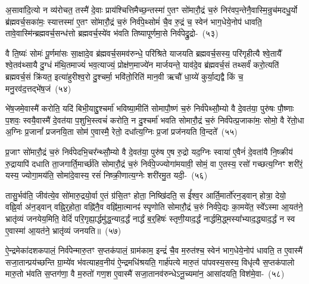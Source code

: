 अ॒सावा॑दि॒त्यो न व्य॑रोचत॒ तस्मै॑ दे॒वाः प्राय॑श्चित्ति\-मैच्छ॒न्तस्मा॑ ए॒तꣳ सो॑मारौ॒द्रं च॒रुं निर॑वप॒न्तेनै॒वास्मि॒न्रुच॑मद\-धु॒र्यो ब्र॑ह्मवर्च॒सका॑मः॒ स्यात्तस्मा॑ ए॒तꣳ सो॑मारौ॒द्रं च॒रुं निर्व॑पे॒थ्सोमं॑ चै॒व रु॒द्रं च॒ स्वेन॑ भाग॒धेये॒नोप॑ धावति॒ तावे॒वास्मि॑न्ब्रह्मवर्च॒सन्ध॑त्तो ब्रह्मवर्च॒स्ये॑व भ॑वति तिष्यापूर्णमा॒से निर्व॑पेद्रु॒द्रो-~(५३)\ip

वै ति॒ष्यः॑ सोमः॑ पू॒र्णमा॑सः सा॒क्षादे॒व ब्र॑ह्मवर्च॒समव॑\-रुन्धे॒ परि॑श्रिते याजयति ब्रह्मवर्च॒सस्य॒ परि॑गृहीत्यै श्वे॒तायै᳚ श्वे॒तव॑थ्सायै दु॒ग्धं म॑थि॒तमाज्यं॑ भव॒त्याज्यं॒ प्रोक्ष॑ण॒माज्ये॑न मार्जयन्ते॒ याव॑दे॒व ब्र॑ह्मवर्च॒सं तथ्सर्वं॑ करो॒त्यति॑ ब्रह्मवर्च॒सं क्रि॑यत॒ इत्या॑हुरीश्व॒रो दु॒श्चर्मा॒ भवि॑तो॒रिति॑ मान॒वी ऋचौ॑ धा॒य्ये॑ कुर्या॒द्यद्वै किं च॒ मनु॒रव॑द॒त्तद्भे॑ष॒जं~(५४)\ip

भे॑ष॒जमे॒वास्मै॑ करोति॒ यदि॑ बिभी॒याद्दु॒श्चर्मा॑ भविष्या॒मीति॑ सोमापौ॒ष्णं च॒रुं निर्व॑पेथ्सौ॒म्यो वै दे॒वत॑या॒ पुरु॑षः पौ॒ष्णाः प॒शवः॒ स्वयै॒वास्मै॑ दे॒वत॑या प॒शुभि॒स्त्वचं॑ करोति॒ न दु॒श्चर्मा॑ भवति सोमारौ॒द्रं च॒रुं निर्व॑पेत्प्र॒जाका॑मः॒ सोमो॒ वै रे॑तो॒धा अ॒ग्निः प्र॒जानां᳚ प्रजनयि॒ता सोम॑ ए॒वास्मै॒ रेतो॒ दधा᳚त्य॒ग्निः प्र॒जां प्रज॑नयति वि॒न्दते᳚~(५५)\ip

प्र॒जाꣳ सो॑मारौ॒द्रं च॒रुं निर्व॑पेदभि॒चर᳚न्थ्सौ॒म्यो वै दे॒वत॑या॒ पुरु॑ष ए॒ष रु॒द्रो यद॒ग्निः स्वाया॑ ए॒वैनं॑ दे॒वता॑यै नि॒ष्क्रीय॑ रु॒द्रायापि॑ दधाति ता॒जगार्ति॒मार्च्छ॑ति सोमारौ॒द्रं च॒रुं निर्व॑पे॒ज्ज्योगा॑मयावी॒ सोमं॒ वा ए॒तस्य॒ रसो॑ गच्छत्य॒ग्निꣳ शरी॑रं॒ यस्य॒ ज्योगा॒मय॑ति॒ सोमा॑दे॒वास्य॒ रसं॑ निष्क्री॒णात्य॒ग्नेः शरी॑रमु॒त यदी॒-~(५६)\ip

तासु॒र्भव॑ति॒ जीव॑त्ये॒व सो॑मारु॒द्रयो॒र्वा ए॒तं ग्र॑सि॒तꣳ होता॒ निष्खि॑दति॒ स ई᳚श्व॒र आर्ति॒मार्तो॑रन॒ड्वान् होत्रा॒ देयो॒ वह्नि॒र्वा अ॑न॒ड्वान् वह्नि॒र्॒\mbox{}होता॒ वह्नि॑नै॒व वह्नि॑मा॒त्मानꣴ॑ स्पृणोति सोमारौ॒द्रं च॒रुं निर्व॑पे॒द्यः का॒मये॑त॒ स्वे᳚\-ऽस्मा आ॒यत॑ने॒ भ्रातृ॑व्यं जनयेय॒मिति॒ वेदिं॑ परि॒गृह्या॒र्द्धमु॑द्ध॒न्याद॒र्द्धं नार्द्धं ब॒र्॒\mbox{}हिषः॑ स्तृणी॒याद॒र्द्धं नार्द्धमि॒द्ध्मस्या᳚भ्याद॒द्ध्याद॒र्द्धं न स्व ए॒वास्मा॑ आ॒यत॑ने॒ भ्रातृ॑व्यं जनयति॥~(५७)\ip

{\anuvakamend[{रु॒द्रो भे॑ष॒जं वि॒न्दते॒ यदि॑ स्तृणी॒याद॒र्द्धं द्वाद॑श च}]}

ऐ॒न्द्रमेका॑\-दश\-कपालं॒ निर्व॑पेन्मारु॒तꣳ स॒प्तक॑पालं॒ ग्राम॑काम॒ इन्द्रं॑ चै॒व म॒रुत॑श्च॒ स्वेन॑ भाग॒धेये॒नोप॑ धावति॒ त ए॒वास्मै॑ सजा॒तान्प्रय॑च्छन्ति ग्रा॒म्ये॑व भ॑वत्याहव॒नीय॑ ऐ॒न्द्रमधि॑श्रयति॒ गार्\mbox{}ह॑पत्ये मारु॒तं पा॑पवस्य॒सस्य॒ विधृ॑त्यै स॒प्तक॑पालो मारु॒तो भ॑वति स॒प्तग॑णा॒ वै म॒रुतो॑ गण॒श ए॒वास्मै॑ सजा॒तानव॑\-रुन्धे\-ऽनू॒च्यमा॑न॒ आसा॑दयति॒ विश॑मे॒वा-~(५८)\ip

